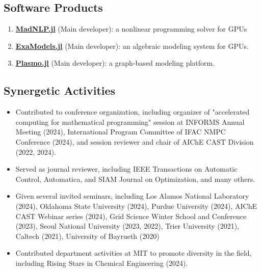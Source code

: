 \documentclass[letterpaper, 11pt]{article}
\begin{document}
\subsection*{Software Products}
\begin{enumerate}[itemsep=1pt, parsep=0pt]
\renewcommand*{\labelenumi}{[S\theenumi]}
\item {\bf \href{https://github.com/MadNLP/MadNLP.jl}{MadNLP.jl}} (Main developer): a nonlinear programming solver for GPUs
\item {\bf \href{https://github.com/exanauts/ExaModels.jl}{ExaModels.jl}} (Main developer): an algebraic modeling system for GPUs.
\item {\bf \href{https://github.com/plasmo-dev/Plasmo.jl}{Plasmo.jl}} (Main developer): a graph-based modeling platform.
\end{enumerate}

\subsection*{Synergetic Activities}

\begin{itemize}[itemsep=1pt, parsep=0pt,leftmargin=*]
\item Contributed to conference organization, including organizer of "accelerated computing for mathematical programming" session at INFORMS Annual Meeting (2024), International Program Committee of IFAC NMPC Conference (2024), and session reviewer and chair of AIChE CAST Division (2022, 2024).
\item Served as journal reviewer, including IEEE Transactions on Automatic Control, Automatica, and SIAM Journal on Optimization, and many others.
\item Given several invited seminars, including Los Alamos National Laboratory (2024), Oklahoma State University (2024), Purdue University (2024), AIChE CAST Webinar series (2024), Grid Science Winter School and Conference (2023), Seoul National University (2023, 2022), Trier University (2021), Caltech (2021), University of Bayrueth (2020)
\item Contributed department activities at MIT to promote diversity in the field, including Rising Stars in Chemical Engineering (2024).
\end{itemize}





\end{document}
